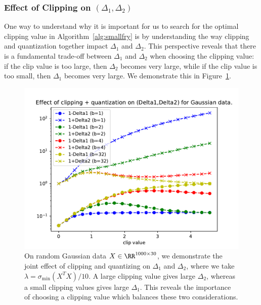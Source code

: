 \subsubsection{Effect of Clipping on $(\Delta_1,\Delta_2)$}
\label{sec:theory_clipping}
One way to understand why it is important for us to search for the optimal clipping value in Algorithm~\ref{alg:smallfry} is by understanding the way clipping and quantization together impact $\Delta_1$ and $\Delta_2$.
This perspective reveals that there is a fundamental trade-off between $\Delta_1$ and $\Delta_2$ when choosing the clipping value:
if the clip value is too large, then $\Delta_2$ becomes very large, while if the clip value is too small, then $\Delta_1$ becomes very large.
We demonstrate this in Figure~\ref{fig:deltas_vs_clip_quant}.
\begin{figure}
	\begin{center}
		\centerline{\includegraphics[width=0.8\columnwidth]{figures/deltas_vs_clip_and_quant.pdf}}
		\caption{On random Gaussian data $X \in \RR^{1000\times 30}$, we demonstrate the joint effect of clipping and quantizing on $\Delta_1$ and $\Delta_2$, where we take $\lambda = \sigma_{\min}(X^T X)/10$.
		A large clipping value gives large $\Delta_2$, whereas a small clipping values gives large $\Delta_1$.
		This reveals the importance of choosing a clipping value which balances these two considerations.
		}
		\label{fig:deltas_vs_clip_quant}
	\end{center}
\end{figure}


